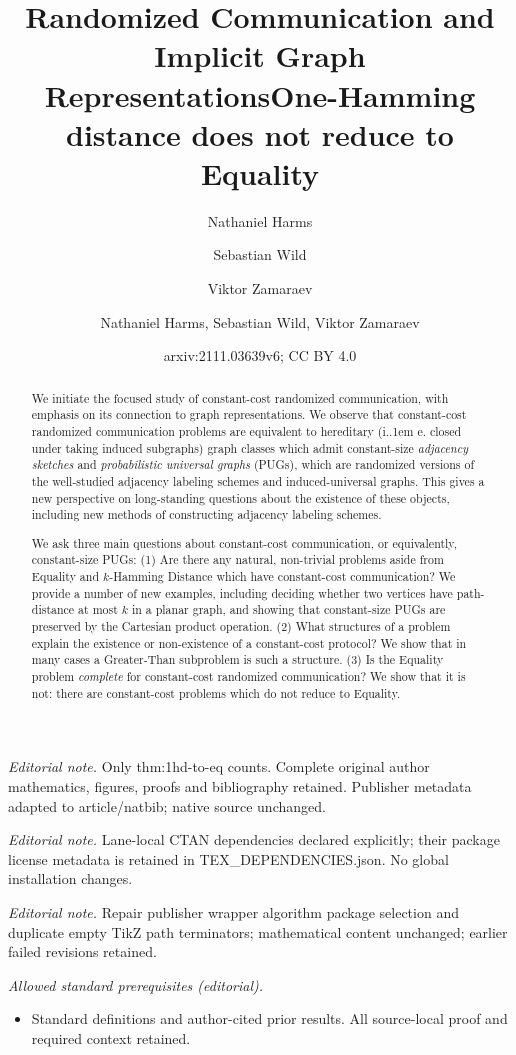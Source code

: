 \documentclass{article}
\title{Randomized Communication and Implicit Graph Representations}
\author{Nathaniel Harms \and Sebastian Wild \and Viktor Zamaraev}\date{}
\title{One-Hamming distance does not reduce to Equality}
\author{Nathaniel Harms, Sebastian Wild, Viktor Zamaraev}
\date{arxiv:2111.03639v6; CC BY 4.0}
\makeatletter
\newcommand*\ie{i.\kern.1em e.\@\xspace} %
\makeatother
\begin{document}
\maketitle
\noindent\textit{Editorial note.} Only thm:1hd-to-eq counts. Complete original author mathematics, figures, proofs and bibliography retained. Publisher metadata adapted to article/natbib; native source unchanged.\par\medskip
\noindent\textit{Editorial note.} Lane-local CTAN dependencies declared explicitly; their package license metadata is retained in TEX\_DEPENDENCIES.json. No global installation changes.\par\medskip
\noindent\textit{Editorial note.} Repair publisher wrapper algorithm package selection and duplicate empty TikZ path terminators; mathematical content unchanged; earlier failed revisions retained.\par\medskip
\noindent\textit{Allowed standard prerequisites (editorial).}\begin{itemize}
\item Standard definitions and author-cited prior results. All source-local proof and required context retained.
\end{itemize}\medskip

\maketitle

\begin{abstract}
We initiate the focused study of constant-cost randomized communication, with emphasis on its
connection to graph representations. We observe that constant-cost randomized communication
problems are equivalent to hereditary (\ie closed under taking induced subgraphs) graph classes
which admit constant-size \emph{adjacency sketches} and \emph{probabilistic universal graphs}
(PUGs), which are randomized versions of the well-studied adjacency labeling schemes and
induced-universal graphs.  This gives a new perspective on long-standing questions about the
existence of these objects, including new methods of constructing adjacency labeling schemes.

We ask three main questions about constant-cost communication, or equivalently, constant-size
PUGs: (1) Are there any natural, non-trivial problems aside from Equality
and $k$-Hamming Distance which have constant-cost communication? We provide a number of new
examples, including deciding whether two vertices have path-distance at most $k$ in a planar graph,
and showing that constant-size PUGs are preserved by the Cartesian product operation.  (2) What
structures of a problem explain the existence or non-existence of a constant-cost protocol?  
We show that in many cases a Greater-Than subproblem is such a structure.
(3) Is the Equality problem \emph{complete} for constant-cost randomized communication? We
show that it is not: there are constant-cost problems which do not reduce to Equality.
\end{abstract}
\end{document}
